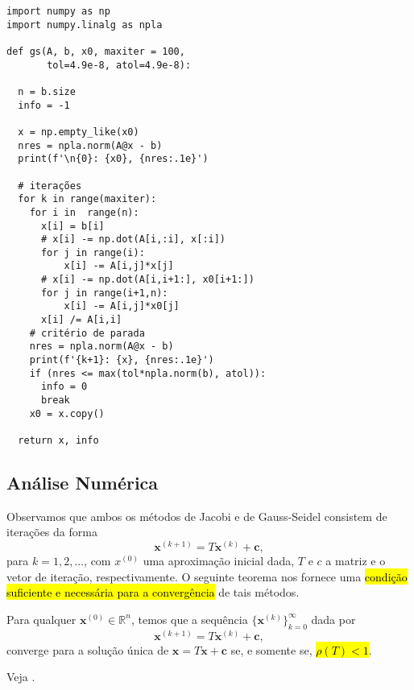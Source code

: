 \begin{ex}
\begin{lstlisting}[caption=gs.py]
import numpy as np
import numpy.linalg as npla

def gs(A, b, x0, maxiter = 100,
       tol=4.9e-8, atol=4.9e-8):
    
  n = b.size
  info = -1

  x = np.empty_like(x0)
  nres = npla.norm(A@x - b)
  print(f'\n{0}: {x0}, {nres:.1e}')
  
  # iterações
  for k in range(maxiter):
    for i in  range(n):
      x[i] = b[i]
      # x[i] -= np.dot(A[i,:i], x[:i])
      for j in range(i):
          x[i] -= A[i,j]*x[j]
      # x[i] -= np.dot(A[i,i+1:], x0[i+1:])
      for j in range(i+1,n):
          x[i] -= A[i,j]*x0[j]
      x[i] /= A[i,i]
    # critério de parada
    nres = npla.norm(A@x - b)
    print(f'{k+1}: {x}, {nres:.1e}')
    if (nres <= max(tol*npla.norm(b), atol)):
      info = 0
      break
    x0 = x.copy()

  return x, info
\end{lstlisting}

\end{ex}

\subsection{Análise Numérica}

Observamos que ambos os métodos de Jacobi e de Gauss-Seidel consistem de iterações da forma
\begin{equation}\label{cap_sislin_sec_jgs:eq:jgs_iter}
  \pmb{x}^{(k+1)} = T\pmb{x}^{(k)} + \pmb{c},
\end{equation}
para $k=1, 2, \ldots$, com $x^{(0)}$ uma aproximação inicial dada, $T$ e $c$ a matriz e o vetor de iteração, respectivamente. O seguinte teorema nos fornece uma \hl{condição suficiente e necessária para a convergência} de tais métodos.

\begin{teo}
  Para qualquer $\pmb{x}^{(0)}\in\mathbb{R}^n$, temos que a sequência $\{\pmb{x}^{(k)}\}_{k=0}^{\infty}$ dada por
  \begin{equation}
    \pmb{x}^{(k+1)} = T\pmb{x}^{(k)} + \pmb{c},
  \end{equation}
  converge para a solução única de $\pmb{x} = T\pmb{x} + \pmb{c}$ se, e somente se, \hl{$\rho(T) < 1$}.
\end{teo}
\begin{dem}
  Veja \cite[Cap. 7, Sec. 7.3]{Burden2016a}.
\end{dem}

